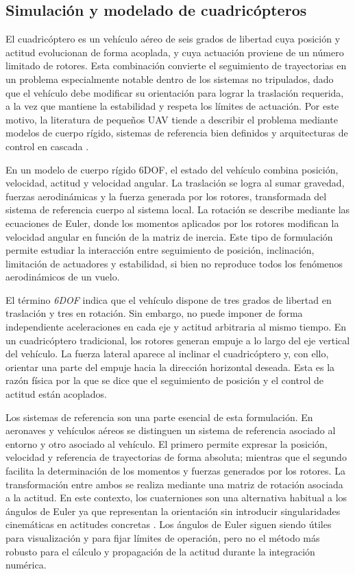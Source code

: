 \subsection{Simulación y modelado de cuadricópteros}

El cuadricóptero es un vehículo aéreo de seis grados de libertad cuya posición 
y actitud evolucionan de forma acoplada, y cuya actuación proviene de un número
limitado de rotores. Esta combinación convierte el seguimiento de trayectorias
en un problema especialmente notable dentro de los sistemas no tripulados, dado
que el vehículo debe modificar su orientación para lograr la traslación requerida,
a la vez que mantiene la estabilidad y respeta los límites de actuación. Por este
motivo, la literatura de pequeños UAV tiende a describir el problema mediante modelos 
de cuerpo rígido, sistemas de referencia bien definidos y arquitecturas de control en 
cascada \cite{beard2012small,mellinger2011minimum,lee2010geometric}.

En un modelo de cuerpo rígido 6DOF, el estado del vehículo combina posición,
velocidad, actitud y velocidad angular. La traslación se logra al sumar
gravedad, fuerzas aerodinámicas y la fuerza generada por los rotores, 
transformada del sistema de referencia cuerpo al sistema local. La rotación
se describe mediante las ecuaciones de Euler, donde los momentos aplicados 
por los rotores modifican la velocidad angular en función de la matriz
de inercia. Este tipo de formulación permite estudiar la interacción entre
seguimiento de posición, inclinación, limitación de actuadores y estabilidad,
si bien no reproduce todos los fenómenos aerodinámicos de un vuelo.

El término \textit{6DOF} indica que el vehículo dispone de tres grados de libertad
en traslación y tres en rotación. Sin embargo, no puede imponer de forma independiente
aceleraciones en cada eje y actitud arbitraria al mismo tiempo. En un cuadricóptero
tradicional, los rotores generan empuje a lo largo del eje vertical del vehículo. La
fuerza lateral aparece al inclinar el cuadricóptero y, con ello, orientar una parte
del empuje hacia la dirección horizontal deseada. Esta es la razón física por la
que se dice que el seguimiento de posición y el control de actitud están acoplados.

Los sistemas de referencia son una parte esencial de esta formulación. En
aeronaves y vehículos aéreos se distinguen un sistema de referencia asociado al 
entorno y otro asociado al vehículo. El primero permite expresar la posición, velocidad y
referencia de trayectorias de forma absoluta; mientras que el segundo facilita la
determinación de los momentos y fuerzas generados por los rotores. La transformación
entre ambos se realiza mediante una matriz de rotación asociada a la actitud. En este
contexto, los cuaterniones son una alternativa habitual a los ángulos de Euler ya que
representan la orientación sin introducir singularidades cinemáticas en actitudes
concretas \cite{kuipers1999quaternions}. Los ángulos de Euler siguen siendo
útiles para visualización y para fijar límites de operación, pero no el método más
robusto para el cálculo y propagación de la actitud durante la integración numérica.

